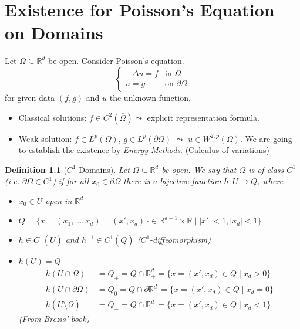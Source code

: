 \documentclass{report}
\theoremstyle{tommy}
\newtheorem{defn}{Definition}
\begin{document}
  \chapter{Existence for Poisson's Equation on Domains}

  Let \(\Omega \subseteq \mathbb{R}^d\) be open. Consider Poisson's equation.
  \[\begin{cases}
    - \Delta u = f & \text{in } \Omega \\ u = g & \text{on } \partial \Omega
  \end{cases}\]
  for given data \((f, g)\) and \(u\) the unknown function.
  \begin{itemize}
    \item Classical solutions: \(f \in C^2(\bar \Omega) \leadsto\) explicit representation formula.
    \item Weak solution: \(f \in L^p( \Omega)\), \(g \in L^p(\partial \Omega)\) \(\leadsto\) \(u \in W^{2,p}(\Omega)\). We are going to establish the existence by \emph{Energy Methods}. (Calculus of variations)
  \end{itemize}

  \begin{defn}[\(C^1\)-Domains]
    Let \(\Omega \subseteq \mathbb{R}^d\) be open. We say that \(\Omega\) is of class \(C^1\) (i.e. \(\partial \Omega \in C^1\)) if for all \(x_0 \in \partial \Omega\) there is a bijective function \(h: U \to Q\), where \begin{itemize}
      \item \(x_0 \in U\) open in \(\mathbb{R}^d\)
      \item \(Q = \{x = (x_1, \dots, x_d) = (x', x_d)\} \in \mathbb{R}^{d-1} \times \mathbb{R} \mid |x'| < 1, |x_d| < 1 \}\)
      \item \(h \in C^1(\bar U)\) and \(h^{-1} \in C^1(\bar Q)\) (\(C^1\)-diffeomorphism)
      \item \(h(U) = Q\)
      \begin{align*}
        h(U \cap \Omega) &= Q_+ = Q \cap \mathbb{R}_+^d = \{x = (x', x_d) \in Q \mid x_d > 0\} \\
        h(U \cap \partial \Omega) &= Q_0 = Q \cap \partial \mathbb{R}_+^d = \{x = (x', x_d) \in Q \mid x_d = 0\} \\
        h(U \setminus \bar \Omega) &= Q_- = Q \cap \mathbb{R}_-^d = \{x = (x', x_d) \in Q \mid x_d < 1\}
      \end{align*}
      (From Brezis' book)
    \end{itemize}
  \end{defn}
  
\end{document}
